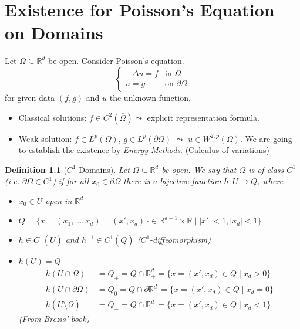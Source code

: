 \documentclass{report}
\theoremstyle{tommy}
\newtheorem{defn}{Definition}
\begin{document}
  \chapter{Existence for Poisson's Equation on Domains}

  Let \(\Omega \subseteq \mathbb{R}^d\) be open. Consider Poisson's equation.
  \[\begin{cases}
    - \Delta u = f & \text{in } \Omega \\ u = g & \text{on } \partial \Omega
  \end{cases}\]
  for given data \((f, g)\) and \(u\) the unknown function.
  \begin{itemize}
    \item Classical solutions: \(f \in C^2(\bar \Omega) \leadsto\) explicit representation formula.
    \item Weak solution: \(f \in L^p( \Omega)\), \(g \in L^p(\partial \Omega)\) \(\leadsto\) \(u \in W^{2,p}(\Omega)\). We are going to establish the existence by \emph{Energy Methods}. (Calculus of variations)
  \end{itemize}

  \begin{defn}[\(C^1\)-Domains]
    Let \(\Omega \subseteq \mathbb{R}^d\) be open. We say that \(\Omega\) is of class \(C^1\) (i.e. \(\partial \Omega \in C^1\)) if for all \(x_0 \in \partial \Omega\) there is a bijective function \(h: U \to Q\), where \begin{itemize}
      \item \(x_0 \in U\) open in \(\mathbb{R}^d\)
      \item \(Q = \{x = (x_1, \dots, x_d) = (x', x_d)\} \in \mathbb{R}^{d-1} \times \mathbb{R} \mid |x'| < 1, |x_d| < 1 \}\)
      \item \(h \in C^1(\bar U)\) and \(h^{-1} \in C^1(\bar Q)\) (\(C^1\)-diffeomorphism)
      \item \(h(U) = Q\)
      \begin{align*}
        h(U \cap \Omega) &= Q_+ = Q \cap \mathbb{R}_+^d = \{x = (x', x_d) \in Q \mid x_d > 0\} \\
        h(U \cap \partial \Omega) &= Q_0 = Q \cap \partial \mathbb{R}_+^d = \{x = (x', x_d) \in Q \mid x_d = 0\} \\
        h(U \setminus \bar \Omega) &= Q_- = Q \cap \mathbb{R}_-^d = \{x = (x', x_d) \in Q \mid x_d < 1\}
      \end{align*}
      (From Brezis' book)
    \end{itemize}
  \end{defn}
  
\end{document}
